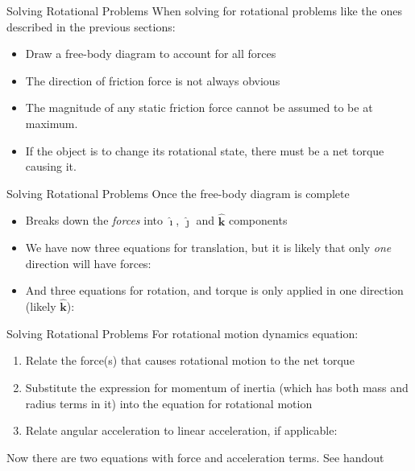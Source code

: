 \documentclass[12pt,compress,aspectratio=169]{beamer}
\newcommand{\iii}{\hat{\bm\imath}}
\newcommand{\jjj}{\hat{\bm\jmath}}
\newcommand{\kkk}{\hat{\bm{k}}}
\newcommand{\eq}[2]{\vspace{#1}{\Large\begin{displaymath}#2\end{displaymath}}}
\begin{document}
\begin{frame}{Solving Rotational Problems}
  When solving for rotational problems like the ones described in the previous
  sections:
  \begin{itemize}
  \item Draw a free-body diagram to account for all forces
  \item The direction of friction force is not always obvious
  \item The magnitude of any static friction force cannot be assumed to be at
    maximum.
  \item If the object is to change its rotational state, there must be a net
    torque causing it.
  \end{itemize}
\end{frame}



\begin{frame}{Solving Rotational Problems}
  Once the free-body diagram is complete
  \begin{itemize}
  \item Breaks down the \emph{forces} into $\iii$, $\jjj$ and $\kkk$ components
  \item We have now three equations for translation, but it is likely that only
    \emph{one} direction will have forces:

    \eq{-.3in}{
      \sum F_x=ma_x\quad\quad \sum F_y=ma_y\quad\quad \sum F_z=ma_z
    }
  \item And three equations for rotation, and torque is only applied in one
    direction (likely $\kkk$):
    
    \eq{-.3in}{
      \sum\tau_x=I_x\alpha_x\quad\quad \sum\tau_y=I_y\alpha_y\quad\quad 
      \sum\tau_z=I_z\alpha_z
    }
  \end{itemize}
\end{frame}



\begin{frame}{Solving Rotational Problems}
  For rotational motion dynamics equation:
  \begin{enumerate}
  \item Relate the force(s) that causes rotational motion to the net torque

    \eq{-.2in}{
      \tau=Fr
    }
  \item Substitute the expression for momentum of inertia (which has both mass
    and radius terms in it) into the equation for rotational motion
  \item Relate angular acceleration to linear acceleration, if applicable:

    \eq{-.25in}{
      \alpha=\frac{a}R
    }
  \end{enumerate}
  Now there are two equations with force and acceleration terms. See handout
\end{frame}
\end{document}
